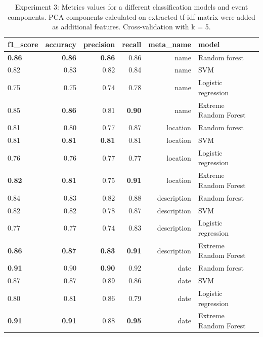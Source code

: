 \begin{table}[h]
\begin{center}
{\renewcommand{\arraystretch}{1.2}
\begin{tabular}{lrrrrll}
\toprule
f1\_score &  accuracy &  precision &  recall &    meta\_name &                  model \\
\midrule
\textbf{0.86} &           \textbf{0.86} &       \textbf{0.86} &    0.86 &         name &          Random forest \\
0.82 &           0.83 &       0.82 &    0.84 &         name &                    SVM \\
0.75 &           0.75 &       0.74 &    0.78 &         name &    Logistic regression \\
0.85 &           \textbf{0.86} &       0.81 &    \textbf{0.90} &         name &  Extreme Random Forest \\
\midrule
0.81 &           0.80 &       0.77 &    0.87 &     location &          Random forest \\
0.81 &           \textbf{0.81} &       \textbf{0.81} &    0.81 &     location &                    SVM \\
0.76 &           0.76 &       0.77 &    0.77 &     location &    Logistic regression \\
\textbf{0.82} &           \textbf{0.81} &       0.75 &    \textbf{0.91} &     location &  Extreme Random Forest \\
\midrule
0.84 &           0.83 &       0.82 &    0.88 &  description &          Random forest \\
0.82 &           0.82 &       0.78 &    0.87 &  description &                    SVM \\
0.77 &           0.77 &       0.74 &    0.83 &  description &    Logistic regression \\
\textbf{0.86} &           \textbf{0.87} &       \textbf{0.83} &    \textbf{0.91} &  description &  Extreme Random Forest \\
\midrule
\textbf{0.91} &           0.90 &       \textbf{0.90} &    0.92 &         date &          Random forest \\
0.87 &           0.87 &       0.89 &    0.86 &         date &                    SVM \\
0.80 &           0.81 &       0.86 &    0.79 &         date &    Logistic regression \\
\textbf{0.91} &           \textbf{0.91} &       0.88 &    \textbf{0.95} &         date &  Extreme Random Forest \\
\bottomrule
\end{tabular}}
\caption{Experiment 3: Metrics values for a different classification models and event components. PCA components calculated on extracted tf-idf matrix were added as additional features. Cross-validation with k = 5.}
\label{table:sumresultPCA}
\end{center}
\end{table} 

